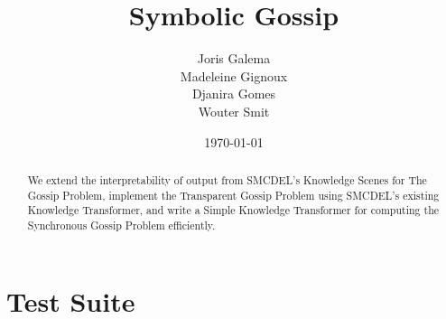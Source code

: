 \documentclass[12pt,a4paper]{article}
\title{Symbolic Gossip}
\author{Joris Galema \\ Madeleine Gignoux \\ Djanira Gomes \\ Wouter Smit}
\date{\today}
\begin{document}
\maketitle

\begin{abstract}
We extend the interpretability of output from SMCDEL's Knowledge Scenes for The Gossip Problem, implement the Transparent Gossip Problem using SMCDEL's existing Knowledge Transformer, and write a Simple Knowledge Transformer for computing the Synchronous Gossip Problem efficiently.
\end{abstract}

\vfill

\tableofcontents

\clearpage


















\appendix

\newpage


\section{Test Suite}\label{app:Tests}








\end{document}
